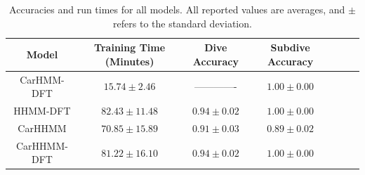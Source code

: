 

\begin{table}
\centering
\caption{Accuracies and run times for all models. All reported values are averages, and $\pm$ refers to the standard deviation.}
\begin{tabular}{ccccccc}
Model       & \multicolumn{1}{c}{Training Time (Minutes)} & \multicolumn{1}{c}{Dive Accuracy} & \multicolumn{1}{c}{Subdive Accuracy}  \\ \hline
CarHMM-DFT  & $15.74 \pm 2.46$                            & -------------                     & $1.00 \pm 0.00$                       \\ 
HHMM-DFT    & $82.43 \pm 11.48$                           & $0.94 \pm 0.02$                   & $1.00 \pm 0.00$                       \\
CarHHMM     & $70.85 \pm 15.89$                           & $0.91 \pm 0.03$                   & $0.89 \pm 0.02$                       \\
CarHHMM-DFT & $81.22 \pm 16.10$                           & $0.94 \pm 0.02$                   & $1.00 \pm 0.00$                       \\
\end{tabular}
\label{table:accuracy}
\end{table}

